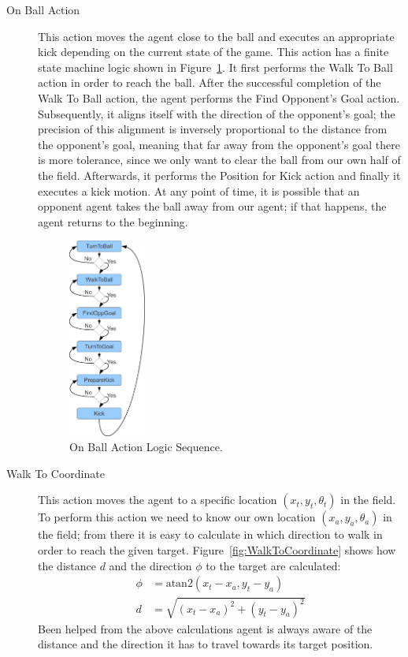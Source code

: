 \begin{description}
 \item[On Ball Action] This action moves the agent close to the ball and executes an appropriate kick depending on the current state of the game. This action has a finite state machine logic shown in Figure~\ref{fig:GoKickBallToGoal}. It first performs the Walk To Ball action in order to reach the ball. After the successful completion of the Walk To Ball action, the agent performs the Find Opponent's Goal action. Subsequently, it aligns itself with the direction of the opponent's goal; the precision of this alignment is inversely proportional to the distance from the opponent's goal, meaning that far away from the opponent's goal there is more tolerance, since we only want to clear the ball from our own half of the field. Afterwards, it performs the Position for Kick action and finally it executes a kick motion. At any point of time, it is possible that an opponent agent takes the ball away from our agent; if that happens, the agent returns to the beginning.


 \begin{figure}[t!]
\centering
  \includegraphics[width=0.25\textwidth]{Chapter3/figures/KickFSM.pdf}
  \caption{On Ball Action Logic Sequence.}
  \label{fig:GoKickBallToGoal}
\end{figure}



 \item[Walk To Coordinate]
This action moves the agent to a specific location $(x_t, y_t, \theta_t)$ in the field. To perform this action we need to know our own location $(x_a, y_a, \theta_a)$ in the field; from there it is easy to calculate in which direction to walk in order to reach the given target. Figure~\ref{fig:WalkToCoordinate} shows how the distance $d$ and the direction $\phi$ to the target are calculated:
\begin{align*}
\phi &= \text{atan2}(x_t-x_a,y_t-y_a)\\
d &= \sqrt{(x_t-x_a)^2 + (y_t-y_a)^2}
\end{align*}
Been helped from the above calculations agent is always aware of the distance and the direction it has to travel towards its target position. 



\end{description}
